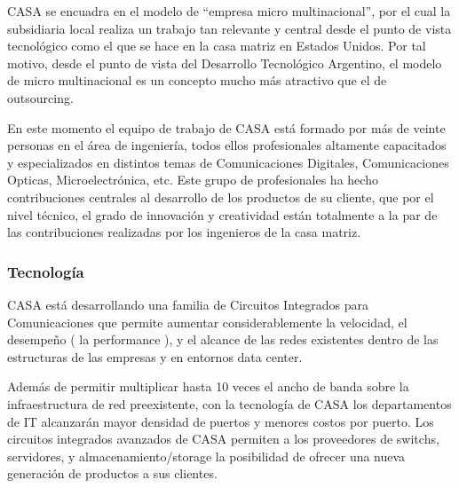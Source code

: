 \documentclass[a4paper]{article}
\begin{document}
\ac{CASA} se encuadra en el modelo de ``empresa micro multinacional'', por el cual la subsidiaria local realiza un trabajo tan relevante y central desde el punto de vista tecnológico como el que se hace en la casa matriz en Estados Unidos. Por tal motivo, desde el punto de vista del Desarrollo Tecnológico Argentino, el modelo de micro multinacional es un concepto mucho más atractivo que el de outsourcing.

En este momento el equipo de trabajo de \ac{CASA} está formado por más de veinte personas en el área de ingeniería, todos ellos profesionales altamente capacitados y especializados en distintos temas de Comunicaciones Digitales, Comunicaciones Opticas, Microelectrónica, etc. Este grupo de profesionales ha hecho contribuciones centrales al desarrollo de los productos de su cliente, que por el nivel técnico, el grado de innovación y creatividad están totalmente a la par de las contribuciones realizadas por los ingenieros de la casa matriz.

\subsubsection{Tecnología}
\ac{CASA} está desarrollando una familia de Circuitos Integrados para Comunicaciones que permite aumentar considerablemente la velocidad, el desempeño ( la performance ), y el alcance de las redes existentes dentro de las estructuras de las empresas y en entornos data center.

Además de permitir multiplicar hasta 10 veces el ancho de banda sobre la infraestructura de red preexistente, con la tecnología de \ac{CASA} los departamentos de IT alcanzarán mayor densidad de puertos y menores costos por puerto. Los circuitos integrados avanzados de \ac{CASA} permiten a los proveedores de switchs, servidores, y almacenamiento/storage la posibilidad de ofrecer una nueva generación de productos a sus clientes.
\end{document}
